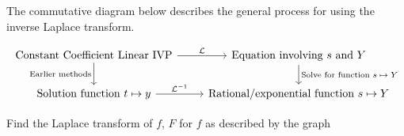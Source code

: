 \documentclass[notes]{subfiles}
\begin{document}
The commutative diagram below describes the general process for using the inverse Laplace transform.

\[
    \begin{tikzcd}
        \text{Constant Coefficient Linear IVP} \arrow[swap]{d}{\text{Earlier methods}} \arrow{r}{\mathcal{L}} & \text{Equation involving $s$ and $Y$} \arrow{d}{\text{Solve for function $s \mapsto Y$}} \\%
        \text{Solution function $t \mapsto y$} \arrow{r}{\mathcal{L}^{-1}} & \text{Rational/exponential function $s \mapsto Y$}
    \end{tikzcd}
\]

\begin{exercise}
    Find the Laplace transform of $f$, $F$ for $f$ as described by the graph
    
\end{exercise}
\end{document}
